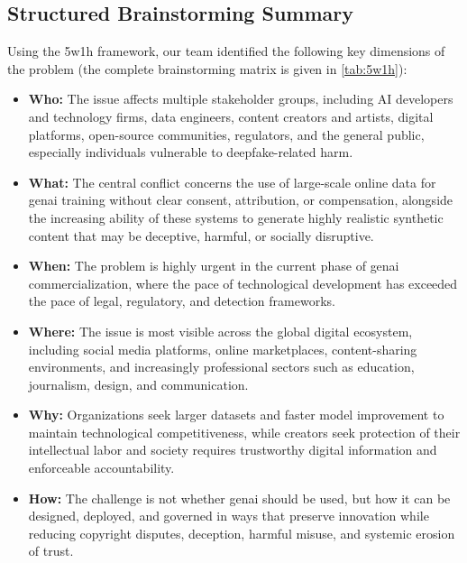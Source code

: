 \subsection{Structured Brainstorming Summary}\label{sec:brainstorming-summary}
Using the \ac{5w1h} framework, our team identified the following key dimensions of the problem (the complete brainstorming matrix is given in \cref{tab:5w1h}):

\begin{itemize}
  \item \textbf{Who:} The issue affects multiple stakeholder groups, including AI developers and technology firms, data engineers, content creators and artists, digital platforms, open-source communities, regulators, and the general public, especially individuals vulnerable to deepfake-related harm.

  \item \textbf{What:} The central conflict concerns the use of large-scale online data for \ac{genai} training without clear consent, attribution, or compensation, alongside the increasing ability of these systems to generate highly realistic synthetic content that may be deceptive, harmful, or socially disruptive.

  \item \textbf{When:} The problem is highly urgent in the current phase of \ac{genai} commercialization, where the pace of technological development has exceeded the pace of legal, regulatory, and detection frameworks.

  \item \textbf{Where:} The issue is most visible across the global digital ecosystem, including social media platforms, online marketplaces, content-sharing environments, and increasingly professional sectors such as education, journalism, design, and communication.

  \item \textbf{Why:} Organizations seek larger datasets and faster model improvement to maintain technological competitiveness, while creators seek protection of their intellectual labor and society requires trustworthy digital information and enforceable accountability.

  \item \textbf{How:} The challenge is not whether \ac{genai} should be used, but how it can be designed, deployed, and governed in ways that preserve innovation while reducing copyright disputes, deception, harmful misuse, and systemic erosion of trust.
\end{itemize}

